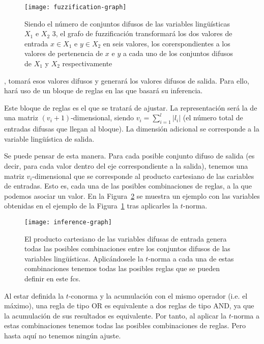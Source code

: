 \begin{figure}
	\centering
	\texttt{[image: fuzzification-graph]}
	\caption[Ejemplo de operación de fuzzificación como grafo computacional]{Siendo el número de conjuntos difusos de las variables lingüísticas $X_1$ e $X_2$ $3$, el grafo de fuzzificación transformará los dos valores de entrada $x \in X_1$ e $y \in X_2$ en seis valores, los corerspondientes a los valores de pertenencia de $x$ e $y$ a cada uno de los conjuntos difusos de $X_1$ y $X_2$ respectivamente}
	\label{fig:fuzzification-graph}
\end{figure}

, tomará esos valores difusos y generará los valores difusos de salida. Para ello, hará uso de un bloque de reglas en las que basará su inferencia.

Este bloque de reglas es el que se tratará de ajustar. La representación será la de una matriz $(v_i + 1)$-dimensional, siendo $v_i = \sum_{i=1}^l \left\vert{l_i}\right\vert$ (el número total de entradas difusas que llegan al bloque). La dimensión adicional se corresponde a la variable lingüística de salida.

Se puede pensar de esta manera. Para cada posible conjunto difuso de salida (es decir, para cada valor dentro del eje correspondiente a la salida), tenemos una matriz $v_i$-dimensional que se corresponde al producto cartesiano de las cariables de entradas. Esto es, cada una de las posibles combinaciones de reglas, a la que podemos asociar un valor. En la Figura~\ref{fig:inference-graph} se muestra un ejemplo con las variables obtenidas en el ejemplo de la Figura~\ref{fig:fuzzification-graph} tras aplicarles la $t$-norma.

\begin{figure}
	\centering
	\texttt{[image: inference-graph]}
	\caption[Producto cartesiano de variables difusas de entrada]{El producto cartesiano de las variables difusas de entrada genera todas las posibles combinaciones entre los conjuntos difusos de las variables lingüísticas. Aplicándosele la $t$-norma a cada una de estas combinaciones tenemos todas las posibles reglas que se pueden definir en este \ac{fcs}.}
	\label{fig:inference-graph}
\end{figure}

Al estar definida la $t$-conorma y la acumulación con el mismo operador (i.e. el máximo), una regla de tipo OR es equivalente a dos reglas de tipo AND, ya que la acumulación de sus resultados es equivalente. Por tanto, al aplicar la $t$-norma a estas combinaciones tenemos todas las posibles combinaciones de reglas. Pero hasta aquí no tenemos ningún ajuste.

